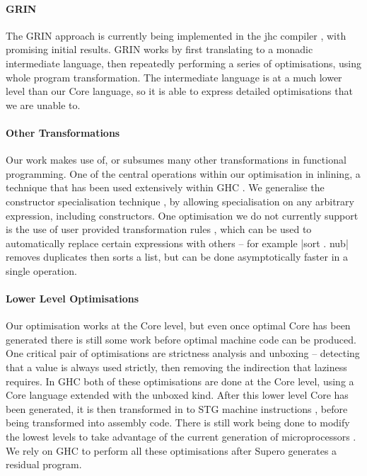 \documentclass{llncs}
\begin{document}
\paragraph{GRIN} The GRIN approach \cite{grin} is currently being implemented in the jhc compiler \cite{jhc}, with promising initial results. GRIN works by first translating to a monadic intermediate language, then repeatedly performing a series of optimisations, using whole program transformation. The intermediate language is at a much lower level than our Core language, so it is able to express detailed optimisations that we are unable to.

\paragraph{Other Transformations} Our work makes use of, or subsumes many other transformations in functional programming. One of the central operations within our optimisation in inlining, a technique that has been used extensively within GHC \cite{spj:inlining}. We generalise the constructor specialisation technique \cite{spj:specconstr}, by allowing specialisation on any arbitrary expression, including constructors. One optimisation we do not currently support is the use of user provided transformation rules \cite{spj:rules}, which can be used to automatically replace certain expressions with others -- for example |sort . nub| removes duplicates then sorts a list, but can be done asymptotically faster in a single operation.

\paragraph{Lower Level Optimisations} Our optimisation works at the Core level, but even once optimal Core has been generated there is still some work before optimal machine code can be produced. One critical pair of optimisations are strictness analysis and unboxing \cite{spj:unboxing} -- detecting that a value is always used strictly, then removing the indirection that laziness requires. In GHC both of these optimisations are done at the Core level, using a Core language extended with the unboxed kind. After this lower level Core has been generated, it is then transformed in to STG machine instructions \cite{spj:stg}, before being transformed into assembly code. There is still work being done to modify the lowest levels to take advantage of the current generation of microprocessors \cite{marlow:pointer_tagging}. We rely on GHC to perform all these optimisations after Supero generates a residual program.
\end{document}
